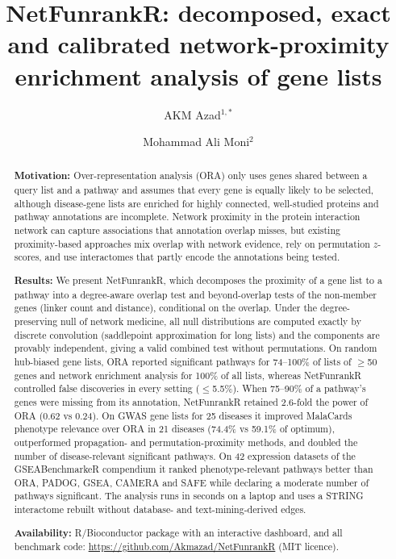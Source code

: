 \documentclass[11pt]{article}
\title{NetFunrankR: decomposed, exact and calibrated network-proximity enrichment analysis of gene lists}
\author{AKM Azad$^{1,*}$ \and Mohammad Ali Moni$^{2}$}
\date{}
\begin{document}
\maketitle
{}

\begin{abstract}
\noindent\textbf{Motivation:} Over-representation analysis (ORA) only uses genes shared between a query list and a pathway and assumes that every gene is equally likely to be selected, although disease-gene lists are enriched for highly connected, well-studied proteins and pathway annotations are incomplete. Network proximity in the protein interaction network can capture associations that annotation overlap misses, but existing proximity-based approaches mix overlap with network evidence, rely on permutation $z$-scores, and use interactomes that partly encode the annotations being tested.

\noindent\textbf{Results:} We present NetFunrankR, which decomposes the proximity of a gene list to a pathway into a degree-aware overlap test and beyond-overlap tests of the non-member genes (linker count and distance), conditional on the overlap. Under the degree-preserving null of network medicine, all null distributions are computed exactly by discrete convolution (saddlepoint approximation for long lists) and the components are provably independent, giving a valid combined test without permutations. On random hub-biased gene lists, ORA reported significant pathways for 74--100\% of lists of $\ge$50 genes and network enrichment analysis for 100\% of all lists, whereas NetFunrankR controlled false discoveries in every setting ($\le$5.5\%). When 75--90\% of a pathway's genes were missing from its annotation, NetFunrankR retained 2.6-fold the power of ORA (0.62 vs 0.24). On GWAS gene lists for 25 diseases it improved MalaCards phenotype relevance over ORA in 21 diseases (74.4\% vs 59.1\% of optimum), outperformed propagation- and permutation-proximity methods, and doubled the number of disease-relevant significant pathways. On 42 expression datasets of the GSEABenchmarkeR compendium it ranked phenotype-relevant pathways better than ORA, PADOG, GSEA, CAMERA and SAFE while declaring a moderate number of pathways significant. The analysis runs in seconds on a laptop and uses a STRING interactome rebuilt without database- and text-mining-derived edges.

\noindent\textbf{Availability:} R/Bioconductor package with an interactive dashboard, and all benchmark code: \url{https://github.com/Akmazad/NetFunrankR} (MIT licence).
\end{abstract}
\end{document}
